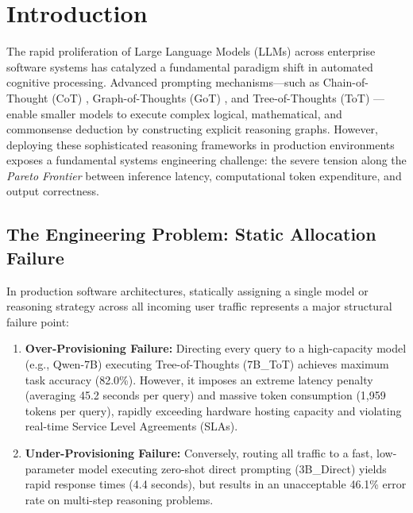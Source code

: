 \documentclass[pdflatex,sn-mathphys-num]{sn-jnl}%
\theoremstyle{thmstyleone}%
\theoremstyle{thmstyletwo}%
\theoremstyle{thmstylethree}%
\begin{document}

\maketitle

\section{Introduction}\label{sec1}

The rapid proliferation of Large Language Models (LLMs) across enterprise software systems has catalyzed a fundamental paradigm shift in automated cognitive processing. Advanced prompting mechanisms---such as Chain-of-Thought (CoT) \cite{wei2022chain}, Graph-of-Thoughts (GoT) \cite{besta2024graph}, and Tree-of-Thoughts (ToT) \cite{yao2023tree}---enable smaller models to execute complex logical, mathematical, and commonsense deduction by constructing explicit reasoning graphs. However, deploying these sophisticated reasoning frameworks in production environments exposes a fundamental systems engineering challenge: the severe tension along the \textit{Pareto Frontier} between inference latency, computational token expenditure, and output correctness.

\subsection{The Engineering Problem: Static Allocation Failure}
In production software architectures, statically assigning a single model or reasoning strategy across all incoming user traffic represents a major structural failure point:
\begin{enumerate}
    \item \textbf{Over-Provisioning Failure:} Directing every query to a high-capacity model (e.g., Qwen-7B) executing Tree-of-Thoughts (7B\_ToT) achieves maximum task accuracy (82.0\%). However, it imposes an extreme latency penalty (averaging 45.2 seconds per query) and massive token consumption (1,959 tokens per query), rapidly exceeding hardware hosting capacity and violating real-time Service Level Agreements (SLAs).
    \item \textbf{Under-Provisioning Failure:} Conversely, routing all traffic to a fast, low-parameter model executing zero-shot direct prompting (3B\_Direct) yields rapid response times (4.4 seconds), but results in an unacceptable 46.1\% error rate on multi-step reasoning problems.
\end{enumerate}
\end{document}
